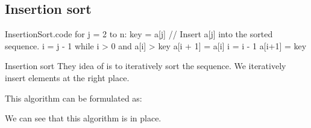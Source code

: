 \documentclass[a4paper]{article}
\begin{document}
\subsection{Insertion sort}


\begin{filecontents*}[overwrite]{InsertionSort.code}
for j = 2 to n:
    key = a[j]
    // Insert a[j] into the sorted sequence.
    i = j - 1
    while i > 0 and a[i] > key
        a[i + 1] = a[i]
        i = i - 1
    a[i+1] = key
\end{filecontents*}

\begin{parag}{Insertion sort}
    They idea of  is to iteratively sort the sequence. We iteratively insert elements at the right place.

    This algorithm can be formulated as:

    We can see that this algorithm is in place.
\end{parag}
\end{document}
